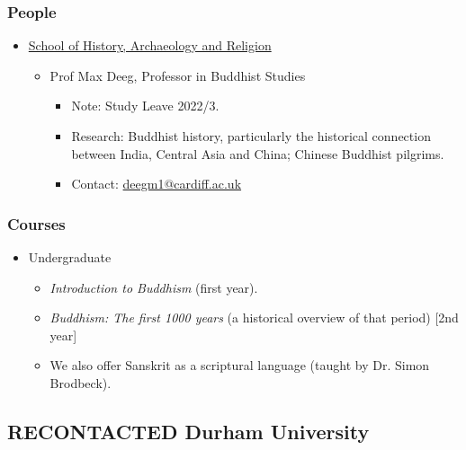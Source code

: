 \documentclass[11pt]{article}
\begin{document}
\subsubsection*{People}
\label{sec:orga780531}
\begin{itemize}
\item \href{https://www.cardiff.ac.uk/history-archaeology-religion}{School of History, Archaeology and Religion}
\label{sec:org876f4c9}
\begin{itemize}
\item Prof Max Deeg, Professor in Buddhist Studies
\label{sec:org75a8205}
\begin{itemize}
\item Note: Study Leave 2022/3.\\
\item Research: Buddhist history, particularly the historical connection between India, Central Asia and China; Chinese Buddhist pilgrims.\\
\item Contact: \href{mailto:deegm1@cardiff.ac.uk}{deegm1@cardiff.ac.uk}\\
\end{itemize}
\end{itemize}
\end{itemize}
\subsubsection*{Courses}
\label{sec:orga707ff8}
\begin{itemize}
\item Undergraduate
\label{sec:org59a7c36}
\begin{itemize}
\item \emph{Introduction to Buddhism} (first year).\\
\item \emph{Buddhism: The first 1000 years} (a historical overview of that period) [2nd year]\\
\item We also offer Sanskrit as a scriptural language (taught by Dr. Simon Brodbeck).\\
\end{itemize}
\end{itemize}
\subsection*{{\bfseries\sffamily RECONTACTED} Durham University}
\label{sec:orgdaabb8f}
\end{document}
